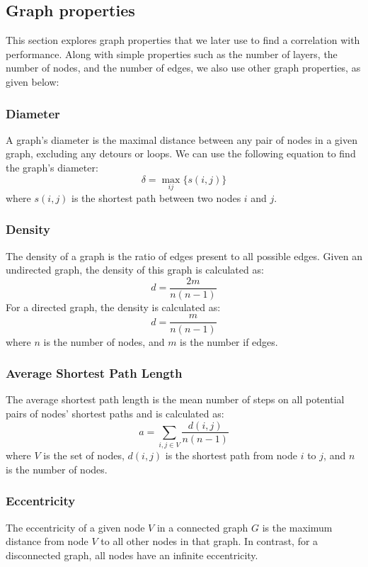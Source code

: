 \subsection{Graph properties}\label{subsection:properties}

This section explores graph properties that we later use to find a correlation with performance. Along with simple properties such as the number of layers, the number of nodes, and the number of edges, we also use other graph properties, as given below:

\subsubsection{Diameter}
A graph's diameter is the maximal distance between any pair of nodes in a given graph, excluding any detours or loops. We can use the following equation to find the graph's diameter:
\begin{equation}
    \delta = \max_{ij}\{s(i, j)\}
\end{equation}
where $s(i,j)$ is the shortest path between two nodes $i$ and $j$.

\subsubsection{Density}
The density of a graph is the ratio of edges present to all possible edges. Given an undirected graph, the density of this graph is calculated as:
\begin{equation}
    d = \frac{2m}{n(n-1)}
\end{equation}
For a directed graph, the density is calculated as:
\begin{equation}
    d = \frac{m}{n(n-1)}
\end{equation}
where $n$ is the number of nodes, and $m$ is the number if edges.

\subsubsection{Average Shortest Path Length}
The average shortest path length is the mean number of steps on all potential pairs of nodes' shortest paths and is calculated as:
\begin{equation}
    a = \sum_{i,j \in V}\frac{d(i, j)}{n(n-1)}
\end{equation}
where $V$ is the set of nodes, $d(i,j)$ is the shortest path from node $i$ to $j$, and $n$ is the number of nodes.

\subsubsection{Eccentricity}
The eccentricity of a given node $V$ in a connected graph $G$ is the maximum distance from node $V$ to all other nodes in that graph. In contrast, for a disconnected graph, all nodes have an infinite eccentricity.

